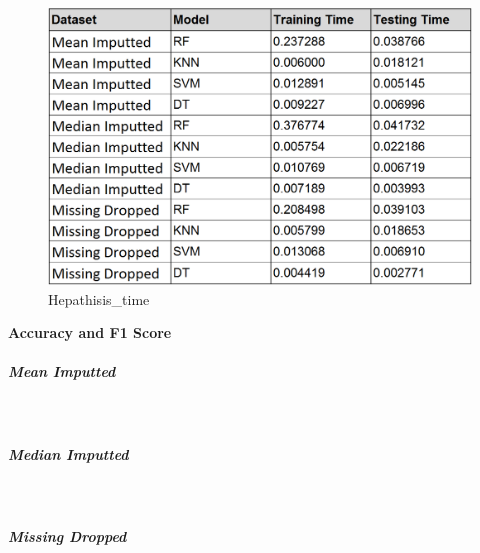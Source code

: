 \documentclass[11pt]{article}
\begin{document}
    \begin{figure}
\centering
\includegraphics{images/Hepathisis_time.PNG}
\caption{Hepathisis\_time}
\end{figure}

    \textbf{Accuracy and F1 Score}

    \hypertarget{mean-imputted}{%
\subparagraph{Mean Imputted}\label{mean-imputted}}

    \begin{center}
    \end{center}
    { \hspace*{\fill} \\}
    
    \hypertarget{median-imputted}{%
\subparagraph{Median Imputted}\label{median-imputted}}

    \begin{center}
    \end{center}
    { \hspace*{\fill} \\}
    
    \hypertarget{missing-dropped}{%
\subparagraph{Missing Dropped}\label{missing-dropped}}

    \begin{center}
    \end{center}
    { \hspace*{\fill} \\}
    
\end{document}
